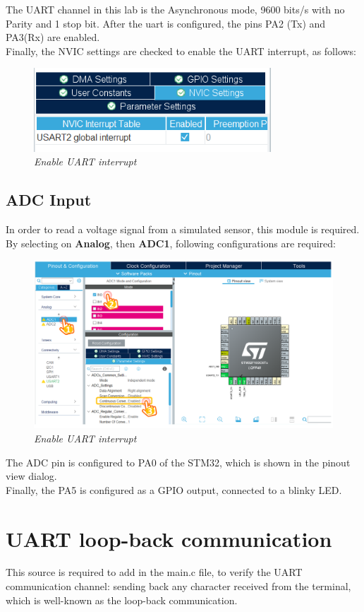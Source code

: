 The UART channel in this lab is the Asynchronous mode, 9600 bits/s with no Parity and 1 stop bit. After the uart is configured, the pins PA2 (Tx) and PA3(Rx) are enabled. \\

Finally, the NVIC settings are checked to enable the UART interrupt, as follows:
\begin{figure}[!htp]
    \centering
    \includegraphics[width=3.5in]{source/picture/bai_6/stm32_uart_2.PNG}
    \caption{\textit{Enable UART interrupt}}
    \label{2}
\end{figure}

\subsection{ADC Input}
In order to read a voltage signal from a simulated sensor, this module is required. By selecting on \textbf{Analog}, then \textbf{ADC1}, following configurations are required:
\begin{figure}[!htp]
    \centering
    \includegraphics[width=4.5in]{source/picture/bai_6/stm32_adc_1.PNG}
    \caption{\textit{Enable UART interrupt}}
    \label{3}
\end{figure}

The ADC pin is configured to PA0 of the STM32, which is shown in the pinout view dialog. \\

Finally, the PA5 is configured as a GPIO output, connected to a blinky LED.

\section{UART loop-back communication}
This source is required to add in the main.c file, to verify the UART communication channel: sending back any character received from the terminal, which is well-known as the loop-back communication.

